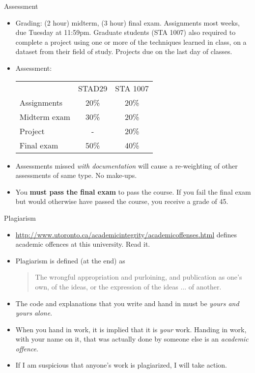 \documentclass[unknownkeysallowed]{beamer}\usepackage[]{graphicx}\usepackage[]{color}
\begin{document}
\begin{frame}{Assessment}
\begin{itemize}
\item Grading: (2 hour) midterm, (3 hour) final exam. Assignments most
  weeks, due Tuesday at 11:59pm. 
  Graduate students (STA 1007) also required to
  complete a project using one or more of the techniques learned in
  class, on a dataset from their field of study.    Projects due on
  the last day of classes.

\item Assessment:

  \begin{tabular}{lcc}
    & STAD29 & STA 1007\\
    Assignments & 20\% & 20\%\\
    Midterm exam & 30\%  & 20\% \\
    Project & - & 20\%\\
    Final exam & 50\% & 40\%
  \end{tabular}

\item Assessments missed \emph{with documentation} will cause a
  re-weighting of other assessments of same type. No make-ups.
\item You \textbf{must pass the final exam} to pass the course. If you
  fail the final exam but would otherwise have passed the course, you
  receive a grade of 45.

\end{itemize}
\end{frame}

\begin{frame}{Plagiarism}

  \begin{itemize}
  \item
    \url{http://www.utoronto.ca/academicintegrity/academicoffenses.html}
    defines academic offences at this university. Read it.
  \item Plagiarism is defined (at the end) as
    \begin{quote}
       The wrongful appropriation and purloining, and publication as one’s own, of the ideas, or the expression of the ideas ... of another.
    \end{quote}
    \item The code and
    explanations  that
    you write and hand in must be \emph{yours and yours
      alone}. 
    \item When you hand in work, it is implied that it is
    \emph{your} work. Handing in work, with your name on it, that was actually done by
    someone else is an \emph{academic offence}.
  \item If I am suspicious
    that anyone's work is plagiarized, I will take action.
    
  \end{itemize}
  
\end{frame}
\end{document}
